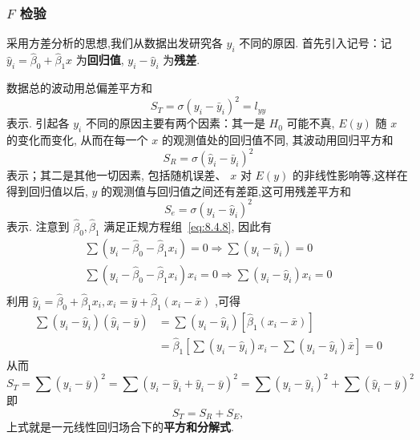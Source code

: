 \subsubsection{$F$ 检验}

采用方差分析的思想,我们从数据出发研究各 $y_i$ 不同的原因. 首先引入记号：记 $\hat{y}_i = \hat{\beta}_0 + \hat{\beta}_1 x$ 为\textbf{回归值}, $y_i - \hat{y}_i$ 为\textbf{残差}.

数据总的波动用总偏差平方和
\begin{equation}\label{eq:8.4.10}
S_T=\sigma ( y_i - \bar{y}_i)^2 = l_{yy}
\end{equation}
表示. 引起各 $y_i$ 不同的原因主要有两个因素：其一是 $H_0$ 可能不真, $E(y)$ 随 $x$ 的变化而变化, 从而在每一个 $x$ 的观测值处的回归值不同, 其波动用回归平方和
\begin{equation}
S_R=\sigma{\left( \hat{y}_i-\bar{y}_i \right)}^2 \label{eq:8.4.11}
\end{equation}
表示；其二是其他一切因素, 包括随机误差、 $x$ 对 $E(y)$ 的非线性影响等,这样在得到回归值以后, $y$ 的观测值与回归值之间还有差距,这可用残差平方和
\begin{equation}
S_{e}=\sigma{\left( y_i-\hat{y}_i \right)}^2
\end{equation}
表示.
注意到 $\hat{\beta}_0, \hat{\beta}_1$ 满足正规方程组~\ref{eq:8.4.8}, 因此有
\begin{equation*}
\begin{array}{c}
\sum{\left( y_i-\hat{\beta }_0-\hat{\beta }_1x_i \right) =0\Rightarrow \sum{\left( y_i-\hat{y}_i \right)}}=0\\
\sum{\left( y_i-\hat{\beta }_0-\hat{\beta }_1x_i \right) x_i=0\Rightarrow \sum{\left( y_i-\hat{y}_i \right)}}x_i=0\\
\end{array}
\end{equation*}
利用 $\hat{y}_i=\hat{\beta }_0+\hat{\beta }_1x_i,x_i=\bar{y}+\hat{\beta }_1\left( x_i-\bar{x} \right) $ ,可得
\begin{equation*}
\begin{aligned}
\sum\left(y_{i}-\hat{y}_{i}\right)\left(\hat{y}_{i}-\bar{y}\right) &=\sum\left(y_{i}-\hat{y}_{i}\right)\left[\hat{\beta}_{1}\left(x_{i}-\bar{x}\right)\right] \\ &=\hat{\beta}_{1}\left[\sum\left(y_{i}-\hat{y}_{i}\right) x_{i}-\sum\left(y_{i}-\hat{y}_{i}\right) \bar{x}\right]=0
\end{aligned}
\end{equation*}
从而
\begin{equation*}
  S_{T} =\sum(y_{i}-\bar{y})^{2} =\sum(y_{i} - \hat{y}_{i} + \hat{y}_{i} - \bar{y})^{2} =\sum(y_{i} - \hat{y}_{i})^{2} +\sum(\hat{y}_{i}-\bar{y})^{2}
\end{equation*}
即
\begin{equation}
S_T = S_R + S_E, \label{eq:8.4.13}
\end{equation}
上式就是一元线性回归场合下的\textbf{平方和分解式}.

